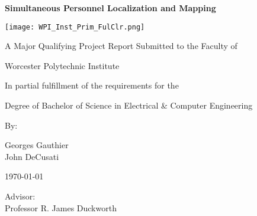 \begin{titlepage}
	\centering
	{\huge\bfseries Simultaneous Personnel Localization and Mapping\par}
	\vfill
	\texttt{[image: WPI\_Inst\_Prim\_FulClr.png]} %
	\vfill
	{\par\large A Major Qualifying Project Report Submitted to the Faculty of \par}
	\vspace{0.25cm}
	{\large Worcester Polytechnic Institute\par}
	\vfill
	{\large In partial fulfillment of the requirements for the \par}
	\vspace{0.25cm}
	{\large Degree of Bachelor of Science in Electrical \& Computer Engineering\par}
	\vfill
	{\large By: \par}
	\vspace{0.25cm}
	{\Large Georges Gauthier \\ John DeCusati \par} 
	\vfill
	{\large \today \par}
	\vfill
	{\begin{flushright} 
	\large Advisor: \\ \Large Professor R. James Duckworth
	\end{flushright}}
\end{titlepage}